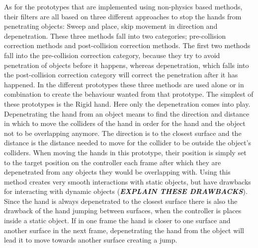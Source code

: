 As for the prototypes that are implemented using non-physics based methods, their filters are all based on three different approaches to stop the hands from penetrating objects: Sweep and place, skip movement in direction and depenetration. These three methods fall into two categories; pre-collision correction methods and post-collision correction methods. The first two methods fall into the pre-collision correction category, because they try to avoid penetration of objects before it happens, whereas depenetration, which falls into the post-collision correction category will correct the penetration after it has happened. In the different prototypes these three methods are used alone or in combination to create the behaviour wanted from that prototype. The simplest of these prototypes is the Rigid hand. Here only the depenetration comes into play. Depenetrating the hand from an object means to find the direction and distance in which to move the colliders of the hand in order for the hand and the object not to be overlapping anymore. The direction is to the closest surface and the distance is the distance needed to move for the collider to be outside the object's colliders. When moving the hands in this prototype, their position is simply set to the target position on the controller each frame after which they are depenetrated from any objects they would be overlapping with. Using this method creates very smooth interactions with static objects, but have drawbacks for interacting with dynamic objects (\textbf{\textit{EXPLAIN THESE DRAWBACKS}}). Since the hand is always depenetrated to the closest surface there is also the drawback of the hand jumping between surfaces, when the controller is places inside a static object. If in one frame the hand is closer to one surface and another surface in the next frame, depenetrating the hand from the object will lead it to move towards another surface creating a jump.

